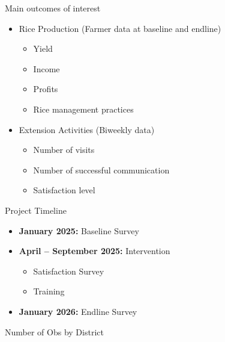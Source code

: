 \documentclass[aspectratio=169]{beamer}
\begin{document}
\begin{frame}{Main outcomes of interest}
	\begin{itemize}
		\item Rice Production (Farmer data at baseline and endline)
		\begin{itemize}
			\item Yield
			\item Income 
			\item Profits
			\item Rice management practices
			\vspace{0.3cm}
		\end{itemize}
		\item Extension Activities (Biweekly data) 
		\begin{itemize}
			\item Number of visits
			\item Number of successful communication
			\item Satisfaction level 
		\end{itemize}
		
		
		
	\end{itemize}
\end{frame}

\begin{frame}{Project Timeline}
	
	\begin{itemize}
		\item \textbf{January 2025:} Baseline Survey
		\vspace{0.3cm}
		
		\item \textbf{April -- September 2025:} Intervention
		\begin{itemize}
			\item Satisfaction Survey
			\item Training
		\end{itemize}
		\vspace{0.3cm}
		
		\item \textbf{January 2026:} Endline Survey
	\end{itemize}
	
\end{frame}

\begin{frame}{Number of Obs by District}
\begin{table}[hbtp]
	\centering
	\begin{threeparttable}
		
		\begin{tabular}{llccc}
			\hline
			
		\end{tabular}
		
	\end{threeparttable}
\end{table}
\end{frame}	
\end{document}
